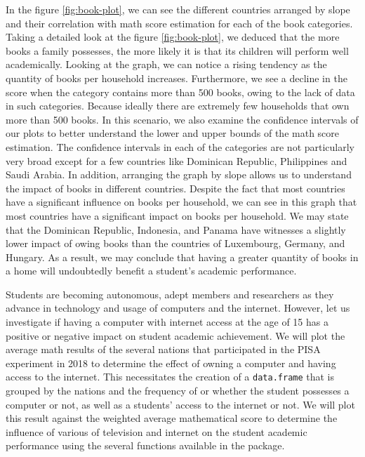 In the figure \ref{fig:book-plot}, we can see the different countries
arranged by slope and their correlation with math score estimation for
each of the book categories. Taking a detailed look at the figure
\ref{fig:book-plot}, we deduced that the more books a family possesses,
the more likely it is that its children will perform well academically.
Looking at the graph, we can notice a rising tendency as the quantity of
books per household increases. Furthermore, we see a decline in the
score when the category contains more than 500 books, owing to the lack
of data in such categories. Because ideally there are extremely few
households that own more than 500 books. In this scenario, we also
examine the confidence intervals of our plots to better understand the
lower and upper bounds of the math score estimation. The confidence
intervals in each of the categories are not particularly very broad
except for a few countries like Dominican Republic, Philippines and
Saudi Arabia. In addition, arranging the graph by slope allows us to
understand the impact of books in different countries. Despite the fact
that most countries have a significant influence on books per household,
we can see in this graph that most countries have a significant impact
on books per household. We may state that the Dominican Republic,
Indonesia, and Panama have witnesses a slightly lower impact of owing
books than the countries of Luxembourg, Germany, and Hungary. As a
result, we may conclude that having a greater quantity of books in a
home will undoubtedly benefit a student's academic performance.

Students are becoming autonomous, adept members and researchers as they
advance in technology and usage of computers and the internet. However,
let us investigate if having a computer with internet access at the age
of 15 has a positive or negative impact on student academic achievement.
We will plot the average math results of the several nations that
participated in the PISA experiment in 2018 to determine the effect of
owning a computer and having access to the internet. This necessitates
the creation of a \texttt{data.frame} that is grouped by the nations and
the frequency of or whether the student possesses a computer or not, as
well as a students' access to the internet or not. We will plot this
result against the weighted average mathematical score to determine the
influence of various of television and internet on the student academic
performance using the several functions available in the
 \citep{ggplot2} package.

